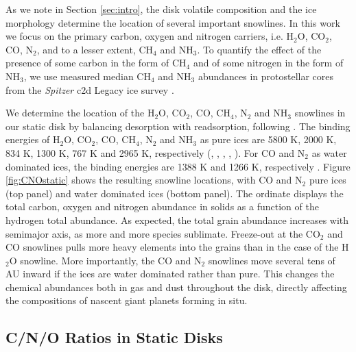 \documentclass[apj]{emulateapj}
\begin{document}
As we note in Section \ref{sec:intro}, the disk volatile composition and the ice morphology determine the location of several important snowlines. In this work we focus on the primary carbon, oxygen and nitrogen carriers, i.e. H$_2$O, CO$_2$, CO, N$_2$, and to a lesser extent, CH$_4$ and NH$_3$. To quantify the effect of the presence of some carbon in the form of CH$_4$ and of some nitrogen in the form of NH$_3$, we use measured median CH$_4$ and NH$_3$ abundances in protostellar cores from the \textit{Spitzer} c2d Legacy ice survey \citep{evans03}. 

We determine the location of the H$_2$O, CO$_2$, CO, CH$_4$, N$_2$ and NH$_3$ snowlines in our static disk by balancing desorption with readsorption, following \citet{hollenbach09}. The binding energies of H$_2$O, CO$_2$, CO, CH$_4$, N$_2$ and NH$_3$ as pure ices are 5800 K, 2000 K, 834 K, 1300 K, 767 K and 2965 K, respectively (\citealt{fraser01}, \citealt{collings04}, \citealt{fayolle16}, \citealt{garrod06}, \citealt{martin14}). For CO and N$_2$ as water dominated ices, the binding energies are 1388 K and 1266 K, respectively \citep{fayolle16}. Figure \ref{fig:CNOstatic} shows the resulting snowline locations, with CO and N$_2$ pure ices (top panel) and water dominated ices (bottom panel). The ordinate displays the total carbon, oxygen and nitrogen abundance in solids as a function of the hydrogen total abundance.  As expected, the total grain abundance increases with semimajor axis, as more and more species sublimate. Freeze-out at the CO$_2$ and CO snowlines pulls more heavy elements into the grains than in the case of the H$_2$O snowline. More importantly, the CO and N$_2$ snowlines move several tens of AU inward if the ices are water dominated rather than pure. This changes the chemical abundances both in gas and dust throughout the disk, directly affecting the compositions of nascent giant planets forming in situ.


\subsection{C/N/O Ratios in Static Disks}
\label{sec:static}
\end{document}
